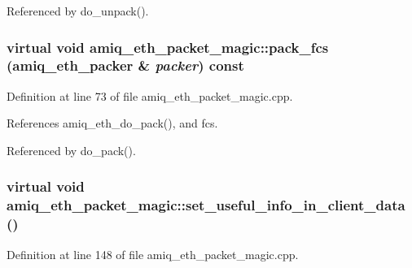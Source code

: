 Referenced by do\_\-unpack().\hypertarget{classamiq__eth__packet__magic_aad43e3e40b85ee732b3e883b85a63ca6}{
\subsubsection[{pack\_\-fcs}]{\setlength{\rightskip}{0pt plus 5cm}virtual void amiq\_\-eth\_\-packet\_\-magic::pack\_\-fcs ({\bf amiq\_\-eth\_\-packer} \& {\em packer}) const}}
\label{classamiq__eth__packet__magic_aad43e3e40b85ee732b3e883b85a63ca6}


Definition at line 73 of file amiq\_\-eth\_\-packet\_\-magic.cpp.

References amiq\_\-eth\_\-do\_\-pack(), and fcs.

Referenced by do\_\-pack().\hypertarget{classamiq__eth__packet__magic_a88cbdc3d686e90941c250d758a72c8be}{
\subsubsection[{set\_\-useful\_\-info\_\-in\_\-client\_\-data}]{\setlength{\rightskip}{0pt plus 5cm}virtual void amiq\_\-eth\_\-packet\_\-magic::set\_\-useful\_\-info\_\-in\_\-client\_\-data ()}}
\label{classamiq__eth__packet__magic_a88cbdc3d686e90941c250d758a72c8be}


Definition at line 148 of file amiq\_\-eth\_\-packet\_\-magic.cpp.

